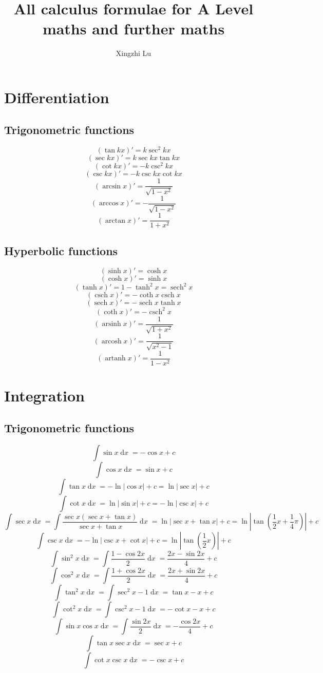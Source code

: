 \documentclass[fleqn, 11pt]{article}
\title{All calculus formulae for A Level maths and further maths}
\author{Xingzhi Lu}
\date{}
\DeclareMathOperator\dx{\mathrm{d}\mathit{x}}
\DeclareMathOperator\sech{sech}
\DeclareMathOperator\csch{csch}
\DeclareMathOperator\arsinh{arsinh}
\DeclareMathOperator\arcosh{arcosh}
\DeclareMathOperator\artanh{artanh}
\begin{document}
\maketitle

\section{Differentiation}
\subsection{Trigonometric functions}
\[(\tan kx)' = k\sec^2 kx\]
\[(\sec kx)' = k\sec kx \tan kx\]
\[(\cot kx)' = -k\csc^2 kx\]
\[(\csc kx)' = -k\csc kx \cot kx\]
\[(\arcsin x)' = \frac{1}{\sqrt{1-x^2}}\]
\[(\arccos x)' = -\frac{1}{\sqrt{1-x^2}}\]
\[(\arctan x)' = \frac{1}{1+x^2}\]
\subsection{Hyperbolic functions}
\[(\sinh x)'=\cosh x\]
\[(\cosh x)'=\sinh x\]
\[(\tanh x)'=1-\tanh^2 x = \sech^2 x\]
\[(\csch x)'=-\coth x \csch x\]
\[(\sech x)'=-\sech x \tanh x\]
\[(\coth x)'=-\csch^2 x\]
\[(\arsinh x)' = \dfrac{1}{\sqrt{1+x^2}}\]
\[(\arcosh x)' = \dfrac{1}{\sqrt{x^2-1}}\]
\[(\artanh x)' = \dfrac{1}{1-x^2}\]

\pagebreak

\section{Integration}
\subsection{Trigonometric functions}
\[\int\sin x \dx = -\cos x + c\]
\[\int\cos x \dx = \sin x + c\]
\[\int \tan x \dx = -\ln |\cos x| + c= \ln |\sec x| + c\]
\[\int \cot x \dx = \ln |\sin x| + c = -\ln |\csc x| + c\]
\[\int \sec x \dx = \int \frac{\sec x(\sec x + \tan x)}{\sec x + \tan x} \dx = \ln |\sec x + \tan x| + c = \ln \left|\tan\left(\frac{1}{2}x+\frac{1}{4}\pi \right)\right| + c\]
\[\int \csc x \dx = -\ln|\csc x + \cot x| + c = \ln \left|\tan\left(\frac{1}{2}x\right)\right| + c\]
\[\int \sin^2 x \dx = \int \frac{1-\cos 2x}{2} \dx = \frac{2x-\sin 2x}{4} + c\]
\[\int \cos^2 x \dx = \int \frac{1+\cos 2x}{2} \dx = \frac{2x+\sin 2x}{4} + c\]
\[\int \tan^2 x \dx = \int \sec^2 x -1 \dx = \tan x - x + c\]
\[\int \cot^2 x \dx = \int \csc^2 x -1 \dx = -\cot x - x + c\]
\[\int \sin x \cos x \dx = \int \frac{\sin 2x}{2} \dx = -\dfrac{\cos 2x}{4} + c\]
\[\int \tan x \sec x \dx = \sec x + c\]
\[\int \cot x \csc x \dx = -\csc x + c\]
\end{document}
